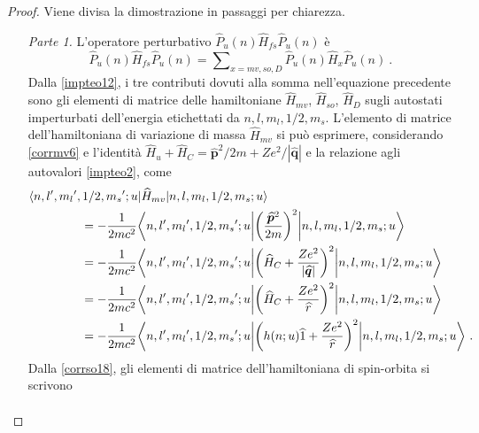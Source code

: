 \documentclass[12pt,a4paper]{report}
\numberwithin{equation}{section}
\numberwithin{section}{chapter}
\begin{document}
	\begin{proof}
		Viene divisa la dimostrazione in passaggi per chiarezza.
		\begin{enumerate}[leftmargin=0pt, itemindent=2.67\parindent]
		\item[\textit{Parte 1.}] L'operatore perturbativo $\widehat{P}_u(n)\widehat{H}_{fs}\widehat{P}_u(n)$ \`e
		\begin{equation}
		\label{appteo8}
		\widehat{P}_u(n)\widehat{H}_{fs}\widehat{P}_u(n) = \sum\nolimits_{x=mv,so,D}\widehat{P}_u(n)\widehat{H}_x\widehat{P}_u(n)~.
		\end{equation}
		Dalla \eqref{impteo12}, i tre contributi dovuti alla somma nell'equazione precedente sono gli elementi di matrice delle hamiltoniane $\widehat{H}_{mv}$, $\widehat{H}_{so}$, $\widehat{H}_D$ sugli autostati imperturbati dell'energia etichettati da $n,l,m_l,1/2,m_s$. L'elemento di matrice dell'hamiltoniana di variazione di massa $\widehat{H}_{mv}$ si pu\`o esprimere, considerando \eqref{corrmv6} e l'identit\`a $\widehat{H}_u + \widehat{H}_C = \widehat{\boldsymbol{p}}^2/2m + Ze^2/|\widehat{\boldsymbol{q}}|$ e la relazione agli autovalori \eqref{impteo2}, come
		\begin{align}
		\label{appteo9}
		&\langle n,l',{m_l}',1/2,{m_s}';u|\widehat{H}_{mv}|n,l,m_l,1/2,m_s;u\rangle\\
		&\hspace{1.5cm}= -\frac{1}{2mc^2}\bigg\langle n,l',{m_l}',1/2,{m_s}';u\bigg|\bigg(\frac{\widehat{\boldsymbol{p}}^2}{2m}\bigg)^2\bigg|n,l,m_l,1/2,m_s;u\bigg\rangle\nonumber\\
		&\hspace{1.5cm}=-\frac{1}{2mc^2}\bigg\langle n,l',{m_l}',1/2,{m_s}';u\bigg|\bigg(\widehat{H}_C + \frac{Ze^2}{|\widehat{\boldsymbol{q}}|}\bigg)^2\bigg|n,l,m_l,1/2,m_s;u\bigg\rangle\nonumber\\
		&\hspace{1.5cm}=-\frac{1}{2mc^2}\bigg\langle n,l',{m_l}',1/2,{m_s}';u\bigg|\bigg(\widehat{H}_C + \frac{Ze^2}{\widehat{r}}\bigg)^2\bigg|n,l,m_l,1/2,m_s;u\bigg\rangle\nonumber\\
		&\hspace{1.5cm}=-\frac{1}{2mc^2}\bigg\langle n,l',{m_l}',1/2,{m_s}';u\bigg|\bigg(h(n;u)\widehat{1} + \frac{Ze^2}{\widehat{r}}\bigg)^2\bigg|n,l,m_l,1/2,m_s;u\bigg\rangle~.\nonumber
		\end{align}
		Dalla \eqref{corrso18}, gli elementi di matrice dell'hamiltoniana di spin-orbita si scrivono
		\begin{align}
		\label{appteo10}

\end{align}
\end{enumerate}
\end{proof}
\end{document}
